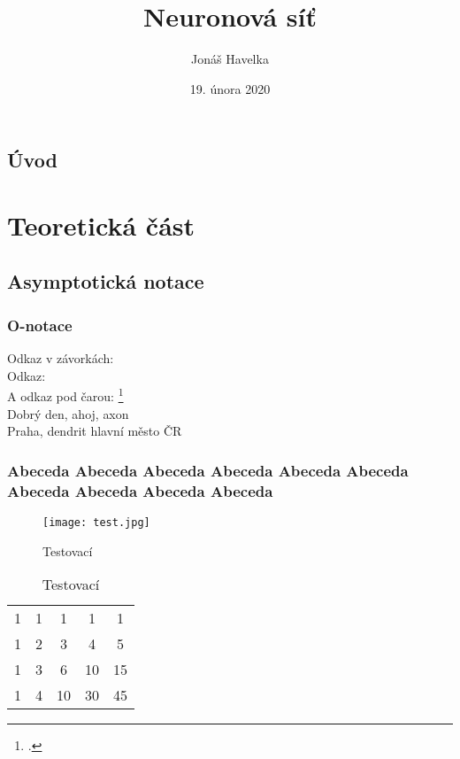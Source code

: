 \documentclass[12pt]{report}			%
\author{Jonáš Havelka}
\title{Neuronová síť}
\date{19. února 2020}
\begin{document}
	\mytitlepage						%
	
	
	\abstrakt{
		\lipsum[1]						%
	}{
		\lipsum[1]						%
	}
	
	\podekovani{
		\lipsum[2]						%
	}
	
	\tableofcontents\newpage			%
	
	
	
	
	\chapter*{Úvod}
	
		\lipsum[1]	
	
	
	\part{Teoretická část}
	
		\chapter{Asymptotická notace}
			
			\section{O-notace}
				Odkaz v závorkách: \parencite[see][page 900]{einstein}\\
				Odkaz: \cite{knuthwebsite}\\
				A odkaz pod čarou: \footcite[see][s. 42]{latexcompanion}\\
				Dobrý den, ahoj, \gls{axon}\\
				Praha, \gls{dendrit} hlavní město ČR
				
			\section{Abeceda Abeceda Abeceda Abeceda Abeceda Abeceda Abeceda Abeceda Abeceda Abeceda }
				\begin{figure}
				  \texttt{[image: test.jpg]}
				  \caption{Testovací}
				  \label{fig:test}
				\end{figure}
				\begin{table}
				  \caption{Testovací}
				  \label{tab:test2}
				  \begin{tabular}{ccccc}
                  1 & 1 & 1  & 1  & 1  \\
                  1 & 2 & 3  & 4  & 5  \\
                  1 & 3 & 6  & 10 & 15 \\
				  1 & 4 & 10 & 30 & 45
				  \end{tabular}
				\end{table}
\end{document}
